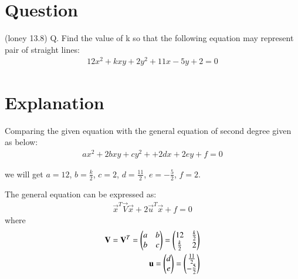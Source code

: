 \documentclass[journal,12pt,twocolumn]{IEEEtran}
\begin{document}
\section{\textbf{Question}}
(loney 13.8) Q. Find the value of k so that the following equation may represent pair of straight lines: 
\begin{align}
    12x^2+kxy+2y^2+11x-5y+2=0\label{eq:1.1}
\end{align}
\section{\textbf{Explanation}}
Comparing the given equation with the general equation of second degree given as below:
\begin{align}
    ax^2+2bxy+cy^2++2dx+2ey+f=0\label{eq:2.1}
\end{align}

we will get $a=12$, $b=\frac{k}{2}$, $c=2$, $d=\frac{11}{2}$, $e=-\frac{5}{2}$, $f=2$.

The general equation can be expressed as:
\begin{align}
    \vec{x}^T\vec{V}\vec{x}+2\vec{u}^T\vec{x}+f=0\label{eq:2.2}
\end{align}
where
\begin{align}
    \mathbf{V}=\mathbf{V}^T=\begin{pmatrix}a & b \\ b & c\end{pmatrix}=\begin{pmatrix}12 & \frac{k}{2} \\ \frac{k}{2} & 2\end{pmatrix}\label{eq:2.3}\\
    \mathbf{u}=\begin{pmatrix}d \\ e\end{pmatrix}=\begin{pmatrix}\frac{11}{2} \\ -\frac{5}{2}\end{pmatrix}\label{eq:2.4}
\end{align}
\end{document}
